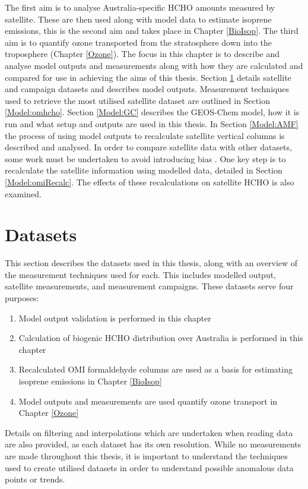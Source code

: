   The first aim is to analyse Australia-specific HCHO amounts measured by satellite.
  These are then used along with model data to estimate isoprene emissions, this is the second aim and takes place in Chapter \ref{BioIsop}.
  The third aim is to quantify ozone transported from the stratosphere down into the troposphere (Chapter \ref{Ozone}).
  The focus in this chapter is to describe and analyse model outputs and measurements along with how they are calculated and compared for use in achieving the aims of this thesis.
  Section \ref{Model:datasets} details satellite and campaign datasets and describes model outputs.
  Measurement techniques used to retrieve the most utilised satellite dataset are outlined in Section \ref{Model:omhcho}.
  Section \ref{Model:GC} describes the GEOS-Chem model, how it is run and what setup and outputs are used in this thesis.
  In Section \ref{Model:AMF} the process of using model outputs to recalculate satellite vertical columns is described and analysed.
  In order to compare satellite data with other datasets, some work must be undertaken to avoid introducing bias \parencite[e.g.,][]{Palmer2001, Eskes2003, Marais2012, Lamsal2014}.
  One key step is to recalculate the satellite information using modelled data, detailed in Section \ref{Model:omiRecalc}.
  The effects of these recalculations on satellite HCHO is also examined.
  
  

\section{Datasets}
  \label{Model:datasets}
  
  This section describes the datasets used in this thesis, along with an overview of the measurement techniques used for each.
  This includes modelled output, satellite measurements, and measurement campaigns.
  These datasets serve four purposes: 
  \begin{enumerate}
    \item Model output validation is performed in this chapter
    \item Calculation of biogenic HCHO distribution over Australia is performed in this chapter
    \item Recalculated OMI formaldehyde columns are used as a basis for estimating isoprene emissions in Chapter \ref{BioIsop}
    \item Model outputs and measurements are used quantify ozone transport in Chapter \ref{Ozone}
  \end{enumerate}
  Details on filtering and interpolations which are undertaken when reading data are also provided, as each dataset has its own resolution.
  While no measurements are made throughout this thesis, it is important to understand the techniques used to create utilised datasets in order to understand possible anomalous data points or trends.
  

